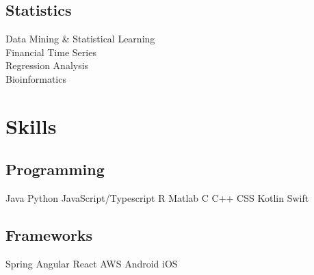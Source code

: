 \documentclass[letterpaper]{deedy-resume} %
\begin{document}
\begin{minipage}[t]{0.33\textwidth}
\sectionspace %

\subsection{Statistics}
Data Mining \& Statistical Learning\\
Financial Time Series\\
Regression Analysis\\
Bioinformatics\\

\sectionspace %


\section{Skills}

\subsection{Programming}

Java \textbullet{}
Python \textbullet{}
JavaScript/Typescript \textbullet{}
R \textbullet{}
Matlab \textbullet{}
C \textbullet{}
C++ \textbullet{}
CSS \textbullet{}
Kotlin \textbullet{}
Swift

\sectionspace %

\subsection{Frameworks}
Spring \textbullet{}
Angular \textbullet{}
React \textbullet{}
AWS \textbullet{}
Android \textbullet{}
iOS

\sectionspace %


\end{minipage} %
\hfill
%
%
\end{document}
